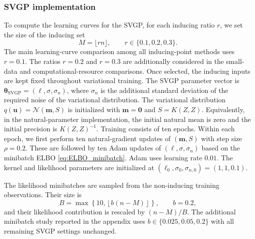 \documentclass[11pt,a4paper]{article}
\newcommand{\bmm}{\boldsymbol{m}}
\newcommand{\btheta}{\boldsymbol{\theta}}
\begin{document}
\subsubsection{SVGP implementation}
To compute the learning curves for the SVGP, for each inducing ratio $r$, we set the size of the inducing set
\begin{equation*}
M=\lfloor rn\rfloor,\qquad r\in\{0.1,0.2,0.3\}.
\end{equation*}
The main learning-curve comparison among all inducing-point methods uses $r=0.1$. The ratios $r=0.2$ and $r=0.3$ are additionally considered in the small-data and computational-resource comparisons. Once selected, the inducing inputs are kept fixed throughout variational training. The SVGP parameter vector is $\btheta_{\mathrm{SVGP}}=(\ell,\sigma,\sigma_n)$, where $\sigma_n$ is the additional standard deviation of the required noise of the variational distribution. The variational distribution $q(\boldsymbol{u})=\mathcal{N}(\bmm,S)$ is initialized with $\bmm=\boldsymbol{0}$ and $S=K(Z,Z)$. Equivalently, in the natural-parameter implementation, the initial natural mean is zero and the initial precision is $K(Z,Z)^{-1}$. Training consists of ten epochs. Within each epoch, we first perform ten natural-gradient updates of $(\bmm,S)$ with step size $\rho=0.2$. These are followed by ten Adam updates of $(\ell,\sigma,\sigma_n)$ based on the minibatch ELBO \eqref{eq:ELBO_minibatch}. Adam uses learning rate $0.01$. The kernel and likelihood parameters are initialized at $(\ell_0,\sigma_0,\sigma_{n,0})=(1,1,0.1).$

The likelihood minibatches are sampled from the non-inducing training observations. Their size is
\begin{equation*}
B=\max\left\{10,\left\lfloor b(n-M)\right\rfloor\right\},\qquad b=0.2,
\end{equation*}
and their likelihood contribution is rescaled by $(n-M)/B$. The additional minibatch study reported in the appendix uses $b\in\{0.025,0.05,0.2\}$ with all remaining SVGP settings unchanged.
\end{document}

